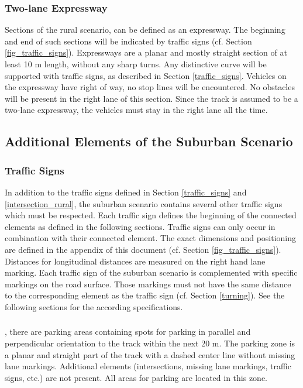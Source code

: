 \subsubsection{Two-lane Expressway}

Sections of the rural scenario, can be defined as an expressway. The beginning
and end of such sections will be indicated by traffic signs (cf. Section
\ref{fig_traffic_signs}). Expressways are a planar and mostly straight section
of at least 10 m length, without any sharp turns. Any distinctive curve will be
supported with traffic signs, as described in Section \ref{traffic_signs}.
Vehicles on the expressway have right of way, no stop lines will be
encountered. No obstacles will be present in the right lane of this section.
Since the track is assumed to be a two-lane expressway, the vehicles must stay
in the right lane all the time.

\subsection{Additional Elements of the Suburban Scenario}
\label{elements_suburban_scenario}
\subsubsection{Traffic Signs}

In addition to the traffic signs defined in Section \ref{traffic_signs} and
\ref{intersection_rural}, the suburban scenario contains several other traffic
signs which must be respected. Each traffic sign defines the beginning of the
connected elements as defined in the following sections. Traffic signs can only
occur in combination with their connected element. The exact dimensions and
positioning are defined in the appendix of this document (cf. Section
\ref{fig_traffic_signs}). Distances for longitudinal distances are measured on
the right hand lane marking. Each traffic sign of the suburban scenario is
complemented with specific markings on the road surface. Those markings must
not have the same distance to the corresponding element as the traffic sign
(cf. Section \ref{turning}). See the following sections for the according
specifications.

\subsubsection{}

, there are parking
areas containing spots for parking in parallel and perpendicular orientation to
the track within the next 20 m. The parking zone is a planar and straight part
of the track with a dashed center line without missing lane markings.
Additional elements (intersections, missing lane markings, traffic signs, etc.)
are not present. All areas for parking are located in this zone.

